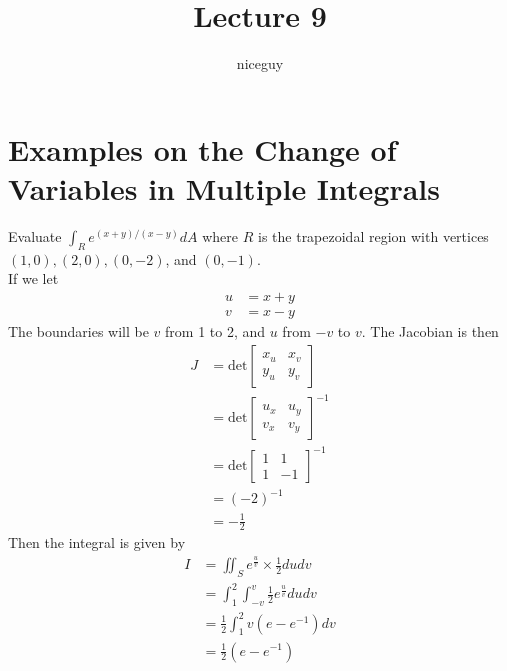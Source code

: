 \documentclass[12pt]{article}
\author{niceguy}
\title{Lecture 9}
\begin{document}
\maketitle

\section{Examples on the Change of Variables in Multiple Integrals}

\begin{ex}
	Evaluate $\int_R e^{(x+y)/(x-y)}dA$ where $R$ is the trapezoidal region with vertices $(1,0), (2,0), (0,-2)$, and $(0,-1)$. \\
	If we let
	\begin{align*}
		u &= x+y \\
		v &= x-y
	\end{align*}
	The boundaries will be $v$ from 1 to 2, and $u$ from $-v$ to $v$. The Jacobian is then
	\begin{align*}
		J &= \text{det} \begin{bmatrix} x_u & x_v \\ y_u & y_v \end{bmatrix} \\
		  &= \text{det} \begin{bmatrix} u_x & u_y \\ v_x & v_y \end{bmatrix}^{-1} \\
		  &= \text{det} \begin{bmatrix} 1 & 1 \\ 1 & -1 \end{bmatrix}^{-1} \\
		  &= (-2)^{-1} \\
		  &= -\frac{1}{2}
	\end{align*}
	Then the integral is given by
	\begin{align*}
		I &= \iint_S e^{\frac{u}{v}} \times \frac{1}{2} dudv \\
		  &= \int_1^2 \int_{-v}^v \frac{1}{2} e^{\frac{u}{v}} dudv \\
		  &= \frac{1}{2} \int_1^2 v(e-e^{-1})dv \\
		  &= \frac{1}{2}(e-e^{-1})
	\end{align*}
\end{ex}
\end{document}
